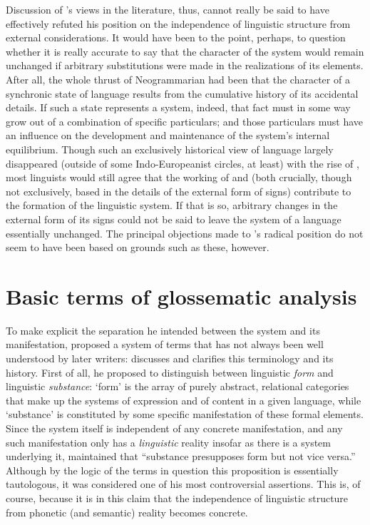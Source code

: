 Discussion of {\Hjelmslev}'s views in the literature, thus, cannot really
be said to have effectively refuted his position on the independence
of linguistic structure from external considerations. It would have
been to the point, perhaps, to question whether it is really accurate
to say that the character of the system would remain unchanged if
arbitrary substitutions were made in the realizations of its
elements. After all, the whole thrust of Neogrammarian  had
been that the character of a synchronic state of language results from
the cumulative history of its accidental details. If such a state
represents a system, indeed, that fact must in some way grow out of a
combination of specific particulars; and those particulars must have
an influence on the development and maintenance of the system's
internal equilibrium. Though such an exclusively historical view of
language largely disappeared (outside of some Indo-Europeanist
circles, at least) with the rise of , most linguists
would still agree that the working of  and  (both
crucially, though not exclusively, based in the details of the
external form of signs) contribute to the formation of the linguistic
system. If that is so, arbitrary changes in the external form of its
signs could not be said to leave the system of a language essentially
unchanged. The principal objections made to {\Hjelmslev}'s radical
position do not seem to have been based on grounds such as these,
however.

\section{Basic terms of glossematic analysis}

To make explicit the separation he intended between the system and its
manifestation, {\Hjelmslev} proposed a system of terms that has not
always been well understood by later writers:
\citet{efj66:form.and.substance,fischer-jorgensen75:trends} discusses
and clarifies this terminology and its history. First of all, he
proposed to distinguish between linguistic \emph{form} and linguistic
\emph{substance}: `form' is the array of purely abstract, relational
categories that make up the systems of expression and of content in a
given language, while `substance' is constituted by some specific
manifestation of these formal elements. Since the system itself is
independent of any concrete manifestation, and any such manifestation
only has a \emph{linguistic} reality insofar as there is a system
underlying it, {\Hjelmslev} maintained that ``substance presupposes form
but not vice versa.'' Although by the logic of the terms in question
this proposition is essentially tautologous, it was considered one of
his most controversial assertions. This is, of course, because it is
in this claim that the independence of linguistic structure from
phonetic (and semantic) reality becomes concrete.

